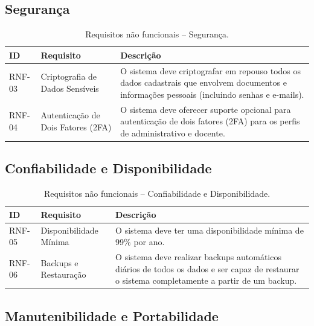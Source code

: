 \subsection{Segurança}

\begin{table}[H]
\centering
\caption{Requisitos não funcionais -- Segurança.}
\begin{tabularx}{\textwidth}{p{} p{} X}
\toprule
\textbf{ID} & \textbf{Requisito} & \textbf{Descrição} \\
\midrule
RNF-03 & Criptografia de Dados Sensíveis & O sistema deve criptografar em repouso todos os dados cadastrais que envolvem documentos e informações pessoais (incluindo senhas e e-mails). \\
RNF-04 & Autenticação de Dois Fatores (2FA) & O sistema deve oferecer suporte opcional para autenticação de dois fatores (2FA) para os perfis de administrativo e docente. \\
\bottomrule
\end{tabularx}
\end{table}

\subsection{Confiabilidade e Disponibilidade}

\begin{table}[H]
\centering
\caption{Requisitos não funcionais -- Confiabilidade e Disponibilidade.}
\begin{tabularx}{\textwidth}{p{} p{} X}
\toprule
\textbf{ID} & \textbf{Requisito} & \textbf{Descrição} \\
\midrule
RNF-05 & Disponibilidade Mínima & O sistema deve ter uma disponibilidade mínima de 99\% por ano. \\
RNF-06 & Backups e Restauração & O sistema deve realizar backups automáticos diários de todos os dados e ser capaz de restaurar o sistema completamente a partir de um backup. \\
\bottomrule
\end{tabularx}
\end{table}

\subsection{Manutenibilidade e Portabilidade}

